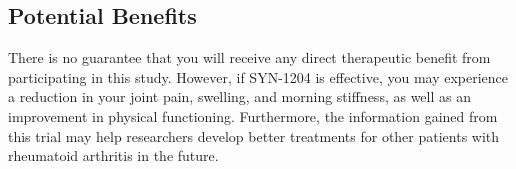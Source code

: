 \subsection{Potential Benefits}
There is no guarantee that you will receive any direct therapeutic benefit from participating in this study. However, if SYN-1204 is effective, you may experience a reduction in your joint pain, swelling, and morning stiffness, as well as an improvement in physical functioning. Furthermore, the information gained from this trial may help researchers develop better treatments for other patients with rheumatoid arthritis in the future.

